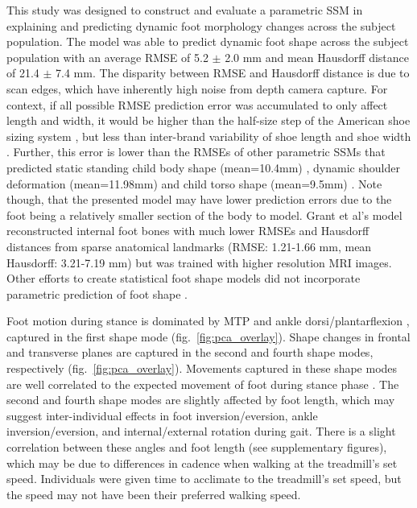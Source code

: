 \documentclass[defaultstyle,11pt]{thesis}
\begin{document}
This study was designed to construct and evaluate a parametric SSM in explaining and predicting dynamic foot morphology changes across the subject population.
The model was able to predict dynamic foot shape across the subject population with an average RMSE of 5.2 \(\pm\) 2.0 mm and mean Hausdorff distance of 21.4 \(\pm\) 7.4 mm.
The disparity between RMSE and Hausdorff distance is due to scan edges, which have inherently high noise from depth camera capture.
For context, if all possible RMSE prediction error was accumulated to only affect length and width, it would be higher than the half-size step of the American shoe sizing system \citep{Luximon2013}, but less than inter-brand variability of shoe length and shoe width \citep{Wannop2019}.
Further, this error is lower than the RMSEs of other parametric SSMs that predicted static standing child body shape (mean=10.4mm) \citep{Park2015a}, dynamic shoulder deformation (mean=11.98mm) \citep{Kim2016} and child torso shape (mean=9.5mm) \citep{Park2017}.
Note though, that the presented model may have lower prediction errors due to the foot being a relatively smaller section of the body to model.
Grant et al's model reconstructed internal foot bones with much lower RMSEs and Hausdorff distances from sparse anatomical landmarks (RMSE: 1.21-1.66 mm, mean Hausdorff: 3.21-7.19 mm) \citep{Grant2020} but was trained with higher resolution MRI images.
Other efforts to create statistical foot shape models did not incorporate parametric prediction of foot shape \citep{Conrad2019, Stankovic2020}.

Foot motion during stance is dominated by MTP and ankle dorsi/plantarflexion \citep{Leardini2007}, captured in the first shape mode (fig.~\ref{fig:pca_overlay}).
Shape changes in frontal and transverse planes are captured in the second and fourth shape modes, respectively (fig.~\ref{fig:pca_overlay}).
Movements captured in these shape modes are well correlated to the expected movement of foot during stance phase \citep{Leardini2007}.
The second and fourth shape modes are slightly affected by foot length, which may suggest inter-individual effects in foot inversion/eversion, ankle inversion/eversion, and internal/external rotation during gait.
There is a slight correlation between these angles and foot length (see supplementary figures), which may be due to differences in cadence when walking at the treadmill's set speed.
Individuals were given time to acclimate to the treadmill's set speed, but the speed may not have been their preferred walking speed.
\end{document}
